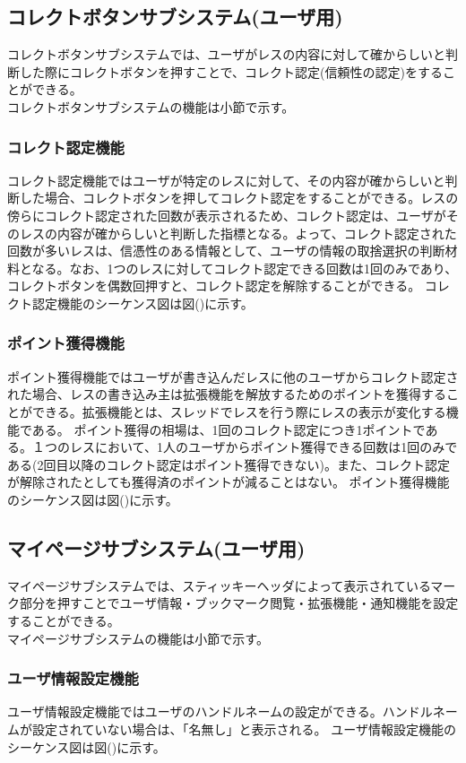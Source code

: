 \documentclass[a4j]{jarticle}
\begin{document}
  \subsection{コレクトボタンサブシステム(ユーザ用)}
  コレクトボタンサブシステムでは、ユーザがレスの内容に対して確からしいと判断した際にコレクトボタンを押すことで、コレクト認定(信頼性の認定)をすることができる。\\
  コレクトボタンサブシステムの機能は小節で示す。
  \subsubsection{コレクト認定機能}
  コレクト認定機能ではユーザが特定のレスに対して、その内容が確からしいと判断した場合、コレクトボタンを押してコレクト認定をすることができる。レスの傍らにコレクト認定された回数が表示されるため、コレクト認定は、ユーザがそのレスの内容が確からしいと判断した指標となる。よって、コレクト認定された回数が多いレスは、信憑性のある情報として、ユーザの情報の取捨選択の判断材料となる。なお、1つのレスに対してコレクト認定できる回数は1回のみであり、コレクトボタンを偶数回押すと、コレクト認定を解除することができる。
  コレクト認定機能のシーケンス図は図()に示す。
  \subsubsection{ポイント獲得機能}
  ポイント獲得機能ではユーザが書き込んだレスに他のユーザからコレクト認定された場合、レスの書き込み主は拡張機能を解放するためのポイントを獲得することができる。拡張機能とは、スレッドでレスを行う際にレスの表示が変化する機能である。
  ポイント獲得の相場は、1回のコレクト認定につき1ポイントである。１つのレスにおいて、1人のユーザからポイント獲得できる回数は1回のみである(2回目以降のコレクト認定はポイント獲得できない)。また、コレクト認定が解除されたとしても獲得済のポイントが減ることはない。
  ポイント獲得機能のシーケンス図は図()に示す。
  \subsection{マイページサブシステム(ユーザ用)}
  マイページサブシステムでは、スティッキーヘッダによって表示されているマーク部分を押すことでユーザ情報・ブックマーク閲覧・拡張機能・通知機能を設定することができる。\\
  マイページサブシステムの機能は小節で示す。
  \subsubsection{ユーザ情報設定機能}
  ユーザ情報設定機能ではユーザのハンドルネームの設定ができる。ハンドルネームが設定されていない場合は、「名無し」と表示される。
  ユーザ情報設定機能のシーケンス図は図()に示す。
\end{document}
